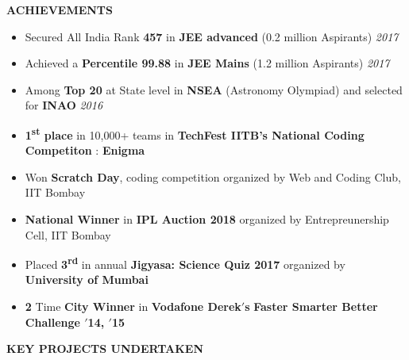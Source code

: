 \documentclass[11pt]{article}%
\begin{document}
\justifying
\noindent
\vspace*{3.5cm}
\begin{flushleft}
\bf{\bf{\LARGE{A}\Large{CHIEVEMENTS}}}
\end{flushleft}
\vspace{-6mm}
\hrulefill
\vspace{-2mm}
\vspace{-2mm}
\begin{itemize}
\setlength\itemsep{0.01em}
\item Secured All India Rank \textbf{457} in \textbf{JEE advanced} (0.2 million Aspirants) \hfill {{{\em {2017}}}}
\vspace{-1mm}
\item Achieved a \textbf{Percentile 99.88} in \textbf{JEE Mains} (1.2 million Aspirants) \hfill {{{\em {2017}}}}
\vspace{-1mm}
\item Among \textbf{Top 20} at State level in \textbf{NSEA} (Astronomy Olympiad) and selected for {\bf INAO} \hfill {{{\em {2016}}}}
\vspace{-1mm}
\end{itemize}
\vspace{-5mm}
\vspace{-3mm}
\begin{itemize}
    \item {\bf 1\textsuperscript{st} place} in 10,000+ teams in {\bf TechFest IITB's National Coding Competiton} : {\bf Enigma}
    \vspace{-2.2mm}
    \item Won {\bf Scratch Day}, coding competition organized by Web and Coding Club, IIT Bombay
    \vspace{-2.2mm}
    \item {\bf National Winner} in {\bf  IPL Auction 2018} organized by Entrepreunership Cell, IIT Bombay
    \vspace{-0.22cm}
    \item Placed {\bf 3\textsuperscript{rd}} in annual {\bf Jigyasa: Science Quiz 2017} organized by {\bf University of Mumbai}
    \vspace{-2.2mm}
    \item \textbf 2 Time {\bf City Winner} in {\bf Vodafone Derek$'$s} {\bf Faster Smarter Better Challenge $'$14, $'$15}
\end{itemize}
\begin{flushleft}
\vspace{0mm}
\bf{\LARGE{K}\Large{EY} \LARGE{P}\Large{ROJECTS} \LARGE{U}\Large{NDERTAKEN}}
\end{flushleft}
\vspace{-7mm}
\hrulefill
\vspace{-3mm}
\end{document}
